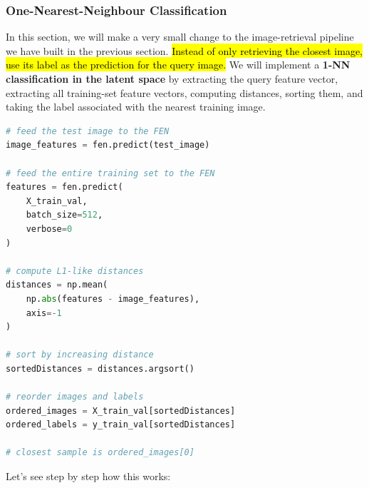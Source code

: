 \subsubsection{One-Nearest-Neighbour Classification}\label{sec:one-nearest-neighbour-classification}

In this section, we will make a very small change to the image-retrieval pipeline we have built in the previous section. \hl{Instead of only retrieving the closest image, use its label as the prediction for the query image.} We will implement a \textbf{1-NN classification in the latent space} by extracting the query feature vector, extracting all training-set feature vectors, computing distances, sorting them, and taking the label associated with the nearest training image.
\begin{lstlisting}[language=Python]
# feed the test image to the FEN
image_features = fen.predict(test_image)

# feed the entire training set to the FEN
features = fen.predict(
    X_train_val,
    batch_size=512,
    verbose=0
)

# compute L1-like distances
distances = np.mean(
    np.abs(features - image_features),
    axis=-1
)

# sort by increasing distance
sortedDistances = distances.argsort()

# reorder images and labels
ordered_images = X_train_val[sortedDistances]
ordered_labels = y_train_val[sortedDistances]

# closest sample is ordered_images[0]
\end{lstlisting}
Let's see step by step how this works:
